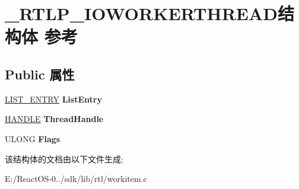 \hypertarget{struct___r_t_l_p___i_o_w_o_r_k_e_r_t_h_r_e_a_d}{}\section{\+\_\+\+R\+T\+L\+P\+\_\+\+I\+O\+W\+O\+R\+K\+E\+R\+T\+H\+R\+E\+A\+D结构体 参考}
\label{struct___r_t_l_p___i_o_w_o_r_k_e_r_t_h_r_e_a_d}
\subsection*{Public 属性}
\begin{DoxyCompactItemize}
\item 
\mbox{\label{struct___r_t_l_p___i_o_w_o_r_k_e_r_t_h_r_e_a_d_aa84e10969be116bcf4002ad55cb9ac66}} 
\hyperlink{struct___l_i_s_t___e_n_t_r_y}{L\+I\+S\+T\+\_\+\+E\+N\+T\+RY} {\bfseries List\+Entry}
\item 
\mbox{\label{struct___r_t_l_p___i_o_w_o_r_k_e_r_t_h_r_e_a_d_a85c439cdf1c4b3e5ad8b4e2574189066}} 
\hyperlink{interfacevoid}{H\+A\+N\+D\+LE} {\bfseries Thread\+Handle}
\item 
\mbox{\label{struct___r_t_l_p___i_o_w_o_r_k_e_r_t_h_r_e_a_d_aa7be0cb121b4af2c6b37687a6bc6d91b}} 
U\+L\+O\+NG {\bfseries Flags}
\end{DoxyCompactItemize}


该结构体的文档由以下文件生成\+:\begin{DoxyCompactItemize}
\item 
E\+:/\+React\+O\+S-\/0../sdk/lib/rtl/workitem.\+c\end{DoxyCompactItemize}
